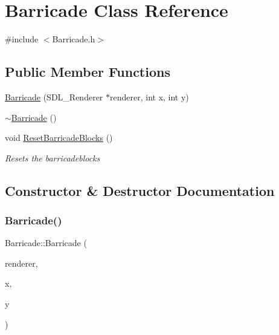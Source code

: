 \hypertarget{class_barricade}{}\section{Barricade Class Reference}
\label{class_barricade}


{\ttfamily \#include $<$Barricade.\+h$>$}

\subsection*{Public Member Functions}
\begin{DoxyCompactItemize}
\item 
\mbox{\hyperlink{class_barricade_a2dfad888aded7d69ae2649e545103110}{Barricade}} (S\+D\+L\+\_\+\+Renderer $\ast$renderer, int x, int y)
\item 
\mbox{\hyperlink{class_barricade_ac74ebf54383e25f526e721964d6e4863}{$\sim$\+Barricade}} ()
\item 
void \mbox{\hyperlink{class_barricade_afae6747d40e49e937efaa1dd063a4461}{Reset\+Barricade\+Blocks}} ()
\begin{DoxyCompactList}\small\item\em Resets the barricadeblocks \end{DoxyCompactList}\end{DoxyCompactItemize}


\subsection{Constructor \& Destructor Documentation}
\mbox{\label{class_barricade_a2dfad888aded7d69ae2649e545103110}} 
\subsubsection{\texorpdfstring{Barricade()}{Barricade()}}
{\footnotesize\ttfamily Barricade\+::\+Barricade (\begin{DoxyParamCaption}\item[{S\+D\+L\+\_\+\+Renderer $\ast$}]{renderer,  }\item[{int}]{x,  }\item[{int}]{y }\end{DoxyParamCaption})}

\mbox{\label{class_barricade_ac74ebf54383e25f526e721964d6e4863}} 
